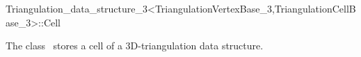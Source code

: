 

\begin{ccRefClass}{Triangulation_data_structure_3<TriangulationVertexBase_3,TriangulationCellBase_3>::Cell}  %


\ccDefinition
  
The class \ccRefName\ stores a cell of a 3D-triangulation data structure.


\ccIsModel


\ccSeeAlso




\end{ccRefClass}


